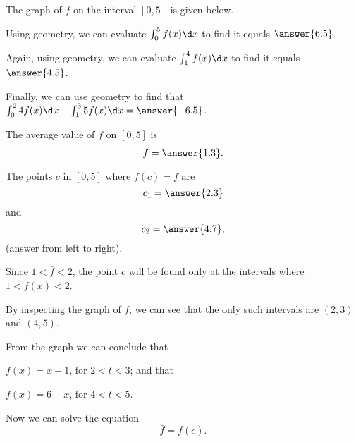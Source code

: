 \documentclass{ximera}
\author{Nela Lakos \and Kyle Parsons}
\begin{document}
\begin{exercise}

The graph of $f$ on the interval $[0,5]$ is given below.

\begin{image}
\end{image}

Using geometry, we can evaluate $\int_0^5 f(x) \d x$ to find it equals  $\answer{6.5}$.

Again, using geometry, we can evaluate $\int_1^4 f(x) \d x$ to find it equals  $\answer{4.5}$.

Finally, we can use geometry to find that  $\int_0^2 4f(x) \d x - \int_1^3 5f(x) \d x = \answer{-6.5}$.

The average value of $f$ on $[0,5]$ is 
\[
\bar{f} = \answer{1.3}.
\]

The points $c$ in $[0,5]$ where $f(c) = \bar{f}$ are 
\[
c_1=\answer{2.3}
\]
 and
  \[
  c_2=\answer{4.7},
  \]
   (answer from left to right).
   
\begin{hint}

Since $1<\bar{f}<2$, the point $c$ will be found only at the intervals where $1<f(x)<2$.

By inspecting the graph of $f$, we can see that the only such intervals  are $(2,3)$ and $(4,5)$.


From the graph we can conclude that

 $f(x)=x-1$, for  $2<t<3$; and that
 
 
 $f(x)=6-x$, for $4<t<5$.
 

Now we can solve the equation
\[
\bar{f} =f(c).
\]
\end{hint}
\end{exercise}
\end{document}
